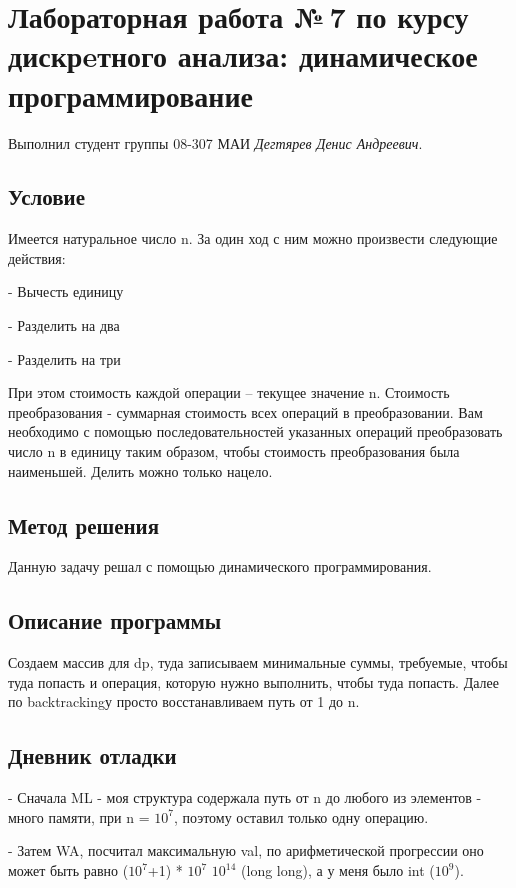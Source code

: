 \documentclass[12pt]{article}
\begin{document}
\section*{Лабораторная работа №\,7 по курсу дискрeтного анализа: динамическое программирование}

Выполнил студент группы 08-307 МАИ \textit{Дегтярев Денис Андреевич}.

\subsection*{Условие}

Имеется натуральное число n. За один ход с ним можно произвести следующие действия:

 - Вычесть единицу  

 - Разделить на два  
 
 - Разделить на три  

При этом стоимость каждой операции – текущее значение n. Стоимость преобразования - суммарная стоимость всех операций в преобразовании. 
Вам необходимо с помощью последовательностей указанных операций преобразовать число n в единицу таким образом, чтобы стоимость преобразования была наименьшей. 
Делить можно только нацело.

\subsection*{Метод решения}

Данную задачу решал с помощью динамического программирования.

\subsection*{Описание программы}

Создаем массив для dp, туда записываем минимальные суммы, требуемые, чтобы туда попасть и операция, которую нужно выполнить, чтобы туда попасть.
Далее по backtrackingу просто восстанавливаем путь от 1 до n.

\subsection*{Дневник отладки}  
  
 
    - Сначала ML - моя структура содержала путь от n до любого из элементов - много памяти, при n = $10^7$, поэтому оставил только одну операцию.

    - Затем WA, посчитал максимальную val, по арифметической прогрессии оно может быть равно ($10^7$+1) * $10^7$ \approx $10^{14}$ (long long), а у меня было int ($10^9$).  
\end{document}
